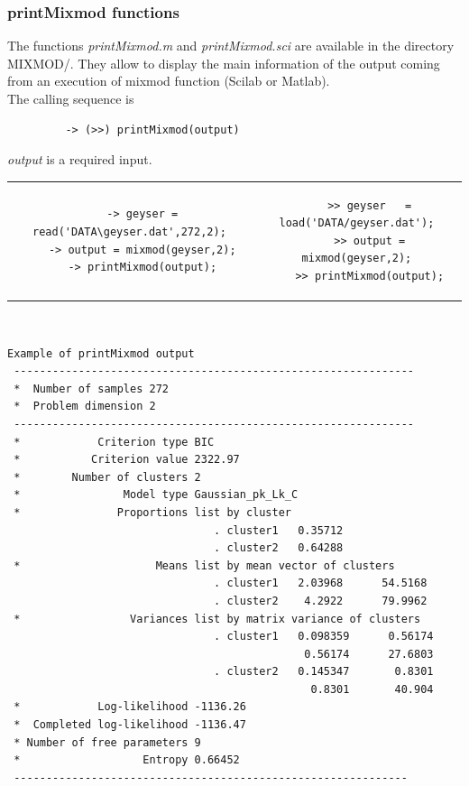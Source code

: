 \subsubsection{{\sc printMixmod} functions}
The functions {\it printMixmod.m}
and {\it printMixmod.sci} are available in the directory MIXMOD/. They allow to display the
main information of the output coming from an execution of mixmod
function (Scilab or Matlab).\\
The calling sequence is
{\scriptsize
\begin{verbatim}
         -> (>>) printMixmod(output)
\end{verbatim}}
{\em output} is a required input. \\


\begin{tabular}{c|c}
\begin{minipage}[c]{0.50\columnwidth}%
{\scriptsize
\begin{verbatim}
    -> geyser = read('DATA\geyser.dat',272,2);
    -> output = mixmod(geyser,2);
    -> printMixmod(output);
\end{verbatim}}
\end{minipage}%
&
\begin{minipage}[c]{0.50\columnwidth}%
{\scriptsize
\begin{verbatim}
    >> geyser   = load('DATA/geyser.dat');
    >> output = mixmod(geyser,2);
    >> printMixmod(output);
\end{verbatim}}
\end{minipage}%
\end{tabular}\\


{\scriptsize
 \begin{verbatim}
Example of printMixmod output
 --------------------------------------------------------------
 *  Number of samples 272
 *  Problem dimension 2
 --------------------------------------------------------------
 *            Criterion type BIC
 *           Criterion value 2322.97
 *        Number of clusters 2
 *                Model type Gaussian_pk_Lk_C
 *               Proportions list by cluster
                                . cluster1   0.35712
                                . cluster2   0.64288
 *                     Means list by mean vector of clusters
                                . cluster1   2.03968      54.5168
                                . cluster2    4.2922      79.9962
 *                 Variances list by matrix variance of clusters
                                . cluster1   0.098359      0.56174
                                              0.56174      27.6803
                                . cluster2   0.145347       0.8301
                                               0.8301       40.904
 *            Log-likelihood -1136.26
 *  Completed log-likelihood -1136.47
 * Number of free parameters 9
 *                   Entropy 0.66452
 -------------------------------------------------------------

  \end{verbatim}}



